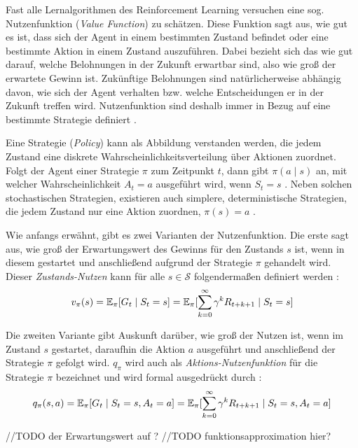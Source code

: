 Fast alle Lernalgorithmen des Reinforcement Learning versuchen eine sog. Nutzenfunktion (\textit{Value Function}) zu schätzen. Diese Funktion sagt aus, \glqq wie gut\grqq{} es ist, dass sich der Agent in einem bestimmten Zustand befindet oder eine bestimmte Aktion in einem Zustand auszuführen. Dabei bezieht sich das \glqq wie gut\grqq{} darauf,
welche Belohnungen in der Zukunft erwartbar sind, also wie groß der erwartete Gewinn ist. Zukünftige Belohnungen sind natürlicherweise abhängig davon, wie sich der Agent verhalten bzw. welche Entscheidungen er in der Zukunft treffen wird. Nutzenfunktion sind deshalb immer in Bezug auf eine bestimmte Strategie definiert \cite[S.~58]{Sutton1998}.
\par 
Eine Strategie (\textit{Policy}) kann als Abbildung verstanden werden, die jedem Zustand eine diskrete Wahrscheinlichkeitsverteilung über Aktionen zuordnet. Folgt der Agent einer Strategie $\pi$ zum Zeitpunkt $t$, dann gibt $\pi(a\mid s)$ an, mit welcher Wahrscheinlichkeit $A_t = a$ ausgeführt wird, wenn $S_t = s$ \cite[S.~58]{Sutton1998}. Neben solchen stochastischen Strategien, existieren auch simplere, deterministische Strategien, die jedem Zustand nur eine Aktion zuordnen, $\pi (s) = a$ \cite[]{Brunskill}.
\par
Wie anfangs erwähnt, gibt es zwei Varianten der Nutzenfunktion. Die erste sagt aus, wie groß der Erwartungswert des Gewinns für den Zustands $s$ ist, wenn in diesem gestartet und anschließend aufgrund der Strategie $\pi$ gehandelt wird. Dieser \textit{Zustands-Nutzen} kann für alle $s \in \mathcal{S}$ folgendermaßen definiert werden \cite[S.~58]{Sutton1998}:
\begin{equation}\label{eq:valueFunction}
    v_\pi(s) = \operatorname{\mathbb{E}}_\pi[G_t \mid S_t = s] = \operatorname{\mathbb{E}}_\pi[\sum_{k=0}^\infty{\gamma^k R_{t+k+1} \mid S_t = s}]
\end{equation}

Die zweiten Variante gibt Auskunft darüber, wie groß der Nutzen ist, wenn im Zustand $s$ gestartet, daraufhin die Aktion $a$ ausgeführt und anschließend der Strategie $\pi$ gefolgt wird. $q_\pi$ wird auch als \textit{Aktions-Nutzenfunktion} für die Strategie $\pi$ bezeichnet und wird formal ausgedrückt durch \cite[S.~58]{Sutton1998}:
\begin{equation}\label{eq:actionValueFunction}
    q_\pi(s,a) = \operatorname{\mathbb{E}}_\pi[G_t \mid S_t = s, A_t = a] = \operatorname{\mathbb{E}}_\pi[\sum_{k=0}^\infty{\gamma^k R_{t+k+1} \mid S_t = s, A_t = a}]
\end{equation}

//TODO der Erwartungswert auf ?
//TODO funktionsapproximation hier? 